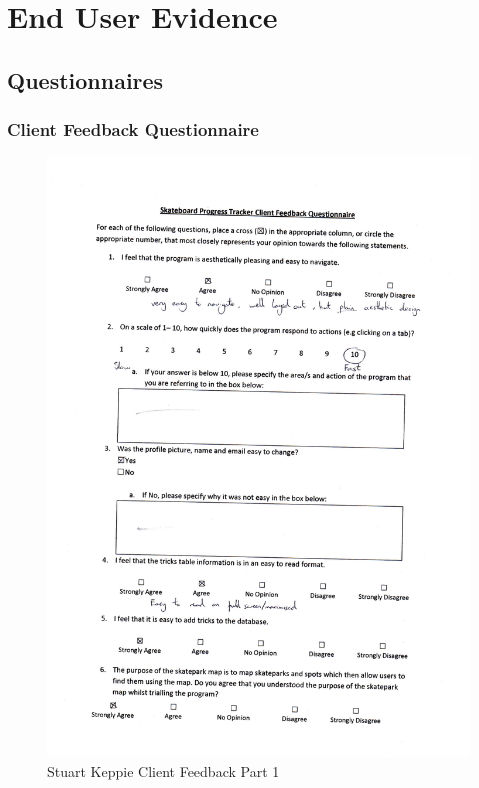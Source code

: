 \section{End User Evidence}

\subsection{Questionnaires} \label{QSub}

\subsubsection{Client Feedback Questionnaire} 


\begin{figure}[H]
    \includegraphics[width=\textwidth]{./Evaluation/images/StuFeedback1.pdf}
    \caption{Stuart Keppie Client Feedback Part 1} \label{fig:StuFeedback1}
\end{figure}

